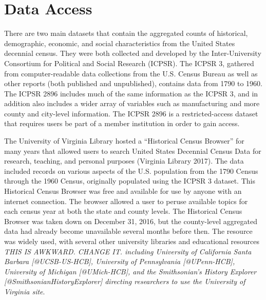 \documentclass[11pt,]{article}
\begin{document}
\section{Data Access}

There are two main datasets that contain the aggregated counts of
historical, demographic, economic, and social characteristics from the
United States decennial census. They were both collected and developed
by the Inter-University Consortium for Political and Social Research
(ICPSR). The ICPSR 3, gathered from computer-readable data collections
from the U.S. Census Bureau as well as other reports (both published and
unpublished), contains data from 1790 to 1960. The ICPSR 2896 includes
much of the same information as the ICPSR 3, and in addition also
includes a wider array of variables such as manufacturing and more
county and city-level information. The ICPSR 2896 is a restricted-access
dataset that requires users be part of a member institution in order to
gain access.

The University of Virginia Library hosted a ``Historical Census
Browser'' for many years that allowed users to search United States
Decennial Census Data for research, teaching, and personal purposes
(Virginia Library 2017). The data included records on various aspects of
the U.S. population from the 1790 Census through the 1960 Census,
originally populated using the ICPSR 3 dataset. This Historical Census
Browser was free and available for use by anyone with an internet
connection. The browser allowed a user to peruse available topics for
each census year at both the state and county levels. The Historical
Census Browser was taken down on December 31, 2016, but the county-level
aggregated data had already become unavailable several months before
then. The resource was widely used, with several other university
libraries and educational resources
\textit{THIS IS AWKWARD. CHANGE IT. including University of California Santa Barbara [@UCSB-US-HCB], University of Pennsylvania [@UPenn-HCB], University of Michigan [@UMich-HCB], and the Smithsonian's History Explorer [@SmithsonianHistoryExplorer] directing researchers to use the University of Virginia site}.
\end{document}
